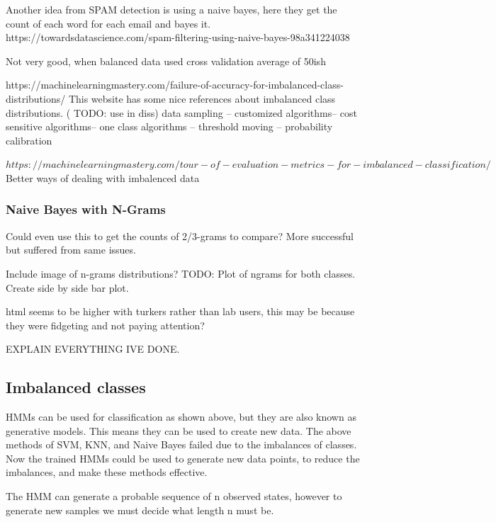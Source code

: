 \documentclass{article}
\begin{document}
Another idea from SPAM detection is using a naive bayes, here they get the count of each word for each email and bayes it. 
 https://towardsdatascience.com/spam-filtering-using-naive-bayes-98a341224038

Not very good, when balanced data used cross validation average of 50ish%

https://machinelearningmastery.com/failure-of-accuracy-for-imbalanced-class-distributions/
This website has some nice references about imbalanced class distributions.
( TODO: use in diss)
data sampling – customized algorithms– cost sensitive algorithms– one class algorithms – threshold moving – probability calibration


$https://machinelearningmastery.com/tour-of-evaluation-metrics-for-imbalanced-classification/$
Better ways of dealing with imbalenced data

\subsubsection{Naive Bayes with N-Grams}
Could even use this to get the counts of 2/3-grams to compare?
More successful but suffered from same issues.

Include image of n-grams distributions?
TODO: Plot of ngrams for both classes. Create side by side bar plot.

html seems to be higher with turkers rather than lab users, this may be because they were fidgeting and not paying attention?

EXPLAIN EVERYTHING IVE DONE.

\subsection{Imbalanced classes}

HMMs can be used for classification as shown above, but they are also known as generative models.
This means they can be used to create new data.
The above methods of SVM, KNN, and Naive Bayes failed due to the imbalances of classes.
Now the trained HMMs could be used to generate new data points, to reduce the imbalances, and make these methods effective.

The HMM can generate a probable sequence of n observed states, however to generate new samples we must decide what length n must be.
\end{document}
